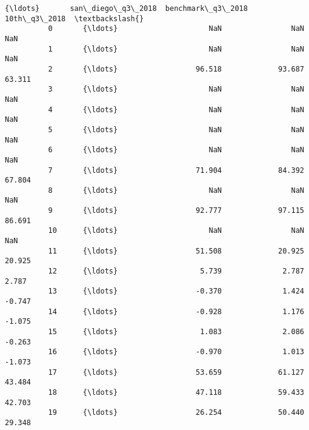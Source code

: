 \documentclass[11pt]{article}
\begin{document}
\begin{Verbatim}[commandchars=\\\{\}]
                  {\ldots}       san\_diego\_q3\_2018  benchmark\_q3\_2018  10th\_q3\_2018  \textbackslash{}
          0       {\ldots}                     NaN                NaN           NaN   
          1       {\ldots}                     NaN                NaN           NaN   
          2       {\ldots}                  96.518             93.687        63.311   
          3       {\ldots}                     NaN                NaN           NaN   
          4       {\ldots}                     NaN                NaN           NaN   
          5       {\ldots}                     NaN                NaN           NaN   
          6       {\ldots}                     NaN                NaN           NaN   
          7       {\ldots}                  71.904             84.392        67.804   
          8       {\ldots}                     NaN                NaN           NaN   
          9       {\ldots}                  92.777             97.115        86.691   
          10      {\ldots}                     NaN                NaN           NaN   
          11      {\ldots}                  51.508             20.925        20.925   
          12      {\ldots}                   5.739              2.787         2.787   
          13      {\ldots}                  -0.370              1.424        -0.747   
          14      {\ldots}                  -0.928              1.176        -1.075   
          15      {\ldots}                   1.083              2.086        -0.263   
          16      {\ldots}                  -0.970              1.013        -1.073   
          17      {\ldots}                  53.659             61.127        43.484   
          18      {\ldots}                  47.118             59.433        42.703   
          19      {\ldots}                  26.254             50.440        29.348   
          

\end{Verbatim}
\end{document}
